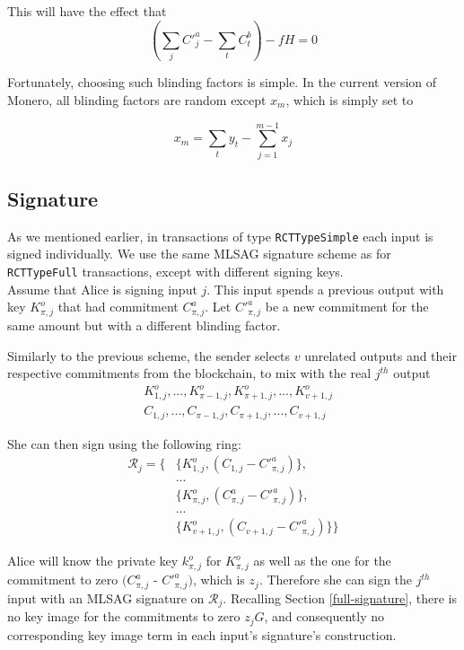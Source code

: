This will have the effect that\\
\[ (\sum_j C'^a_{j} - \sum_t C^b_{t}) - f H = 0\]


Fortunately, choosing such blinding factors is simple. In the current version of Monero, all blinding factors are random except $x_m$, which is simply set to

\[x_m = \sum_t y_t - \sum_{j=1}^{m-1} x_j  \]




\subsection{Signature}

As we mentioned earlier, in transactions of type {\tt RCTTypeSimple} each input is signed individually. We use the same MLSAG signature scheme as for {\tt RCTTypeFull} transactions, except with different signing keys.
\\

Assume that Alice is signing input $j$. This input spends a previous output with key $K^o_{\pi,j}$ that had commitment $C^a_{\pi,j}$. Let $C'^a_{\pi,j}$ be a new commitment for the same amount but with a different blinding factor.

Similarly to the previous scheme, the sender selects $v$ unrelated outputs and their respective commitments from the blockchain, to mix with the real $j^{th}$ output
\begin{align*}
& K^o_{1, j}, ..., K^o_{\pi-1, j}, K^o_{\pi+1, j}, ..., K^o_{v+1, j} \\
& C_{1, j}, ..., C_{\pi-1, j}, C_{\pi+1, j}, ..., C_{v+1, j}
\end{align*}


She can then sign using the following ring:
\begin{align*}
\mathcal{R}_j = \{ &\{K^o_{1, j}, (C_{1, j} - C'^a_{\pi, j})\}, \\
&... \\
&\{ K^o_{\pi, j}, (C^a_{\pi, j} - C'^a_{\pi, j})\}, \\
&... \\
&\{ K^o_{v+1, j}, (C_{v+1, j} - C'^a_{\pi, j})\}\}
\end{align*}


Alice will know the private key $k^o_{\pi,j}$ for $K^o_{\pi,j}$ as well as the one for the commitment to zero $(C^a_{\pi,j}$ - $C'^a_{\pi,j})$, which is $z_j$. Therefore she can sign the $j^{th}$ input with an MLSAG signature on $\mathcal{R}_j$. Recalling Section \ref{full-signature}, there is no key image for the commitments to zero $z_j G$, and consequently no corresponding key image term in each input’s signature’s construction.
\\

